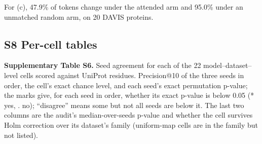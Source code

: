 \documentclass[
  10pt,
]{article}
\begin{document}
For (c), 47.9\% of tokens change under the attended arm and 95.0\% under an unmatched random arm, on 20 DAVIS proteins.

\subsection{S8 Per-cell tables}\label{s8-per-cell-tables}

\textbf{Supplementary Table S6.} Seed agreement for each of the 22 model--dataset--level cells scored against UniProt residues. Precision@10 of the three seeds in order, the cell's exact chance level, and each seed's exact permutation p-value; the marks give, for each seed in order, whether its exact p-value is below 0.05 (* yes, . no); ``disagree'' means some but not all seeds are below it. The last two columns are the audit's median-over-seeds p-value and whether the cell survives Holm correction over its dataset's family (uniform-map cells are in the family but not listed).
\end{document}
